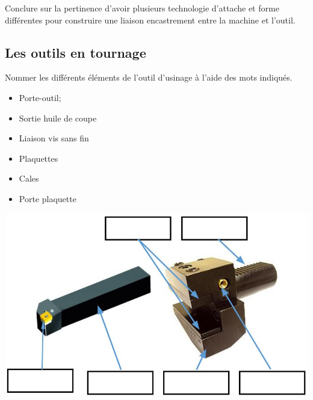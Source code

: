 \documentclass[12pt,a4paper]{article} %
\begin{document}

\newpage


\begin{exo} Conclure sur la pertinence d'avoir plusieurs technologie d'attache et forme différentes pour construire une liaison encastrement entre la machine et l'outil.
\end{exo}
\marginnote{1 pt}


\subsection{Les outils en tournage}

\begin{exo} Nommer les différents  éléments de l’outil d’usinage à l'aide des mots
indiqués. \end{exo}
\begin{minipage}{.55\linewidth}
\begin{itemize}
    \item Porte-outil;
    \item Sortie huile de coupe
    \item Liaison vis sans fin
\end{itemize} 
\end{minipage}
\begin{minipage}{.44\linewidth}
\begin{itemize}
    \item Plaquettes
    \item Cales
    \item Porte plaquette
\end{itemize} 
\end{minipage}
\includegraphics[scale=0.65]{PP1.JPG}
\end{document}
